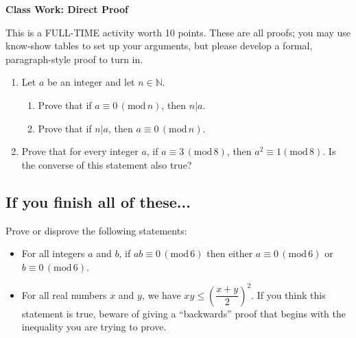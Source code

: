 \documentclass[11pt]{article}
\begin{document}
	
	\thispagestyle{empty}
	\renewcommand{\headrulewidth}{0.0pt}
	\thispagestyle{fancy}
	\lfoot{}
	\cfoot{}
	\rfoot{}	
	
	\vspace*{0in}

		\begin{center}
			\begin{large}
			\textbf{Class Work: Direct Proof} \\
			\end{large}
		\end{center}
		
This is a FULL-TIME activity worth 10 points. These are all proofs; you may use know-show tables to set up your arguments, but please develop a formal, paragraph-style proof to turn in. 

\begin{enumerate}

\item Let $a$ be an integer and let $n \in \mathbb{N}$. 
	\begin{enumerate}
		\item Prove that if $a \equiv 0 \, (\text{mod}\, n)$, then $n | a$. 
		\item Prove that if $n | a$, then $a \equiv 0 \, (\text{mod} \, n)$. 
	\end{enumerate}
 
\item Prove that for every integer $a$, if $a \equiv 3 \, (\text{mod} \, 8)$, then $a^2 \equiv 1 (\text{mod} \, 8)$. Is the converse of this statement also true?  


	
\end{enumerate}	
	
\subsection*{If you finish all of these...}

Prove or disprove the following statements: 
\begin{itemize}
	\item For all integers $a$ and $b$, if $ab \equiv 0 \, (\text{mod} \, 6)$ then either $a \equiv 0 \, (\text{mod} \, 6)$ or $b \equiv 0 \, (\text{mod} \, 6)$. 
	\item For all real numbers $x$ and $y$, we have $xy \leq \left( \dfrac{x+y}{2} \right)^2$. If you think this statement is true, beware of giving a ``backwards'' proof that begins with the inequality you are trying to prove. 
\end{itemize}
\end{document}
